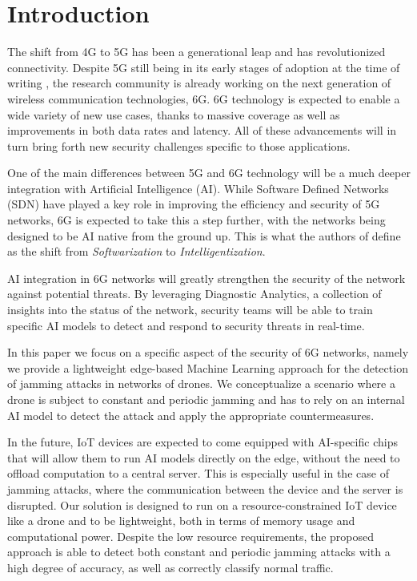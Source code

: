 \documentclass[futureinternet,article,submit,pdftex,moreauthors]{Definitions/mdpi}
\begin{document}
\section{Introduction}

The shift from 4G to 5G has been a generational leap and has revolutionized connectivity. 
Despite 5G still being in its early stages of adoption at the time of writing \cite{5GStatisticsTaylor}, the research community is already working on the next generation of wireless communication technologies, 6G. 
6G technology is expected to enable a wide variety of new use cases, thanks to massive coverage as well as improvements in both data rates and latency. All of these advancements will in turn bring forth new security challenges specific to those applications. 

One of the main differences between 5G and 6G technology will be a much deeper integration with Artificial Intelligence (AI). While Software Defined Networks (SDN) have played a key role in improving the efficiency and security 
of 5G networks, 6G is expected to take this a step further, with the networks being designed to be AI native from the ground up. This is what the authors of \cite{6GRoadmapLetaief} define as 
the shift from \textit{Softwarization} to \textit{Intelligentization}. 

AI integration in 6G networks will greatly strengthen the security of the network against potential threats. 
By leveraging Diagnostic Analytics, a collection of insights into the status of the network, security teams 
will be able to train specific AI models to detect and respond to security threats in real-time.

In this paper we focus on a specific aspect of the security of 6G networks, namely we provide a lightweight edge-based Machine Learning approach 
for the detection of jamming attacks in networks of drones. We conceptualize a scenario where a drone is subject to constant and periodic jamming and has to rely on an internal AI model to detect the attack and apply the appropriate countermeasures. 

In the future, IoT devices are expected to come equipped with AI-specific chips that will allow them to run AI models directly on the edge, without the need to offload computation to a central server. This is especially useful in the case of jamming attacks, where the communication between the device and the server is disrupted.
Our solution is designed to run on a resource-constrained IoT device like a drone and to be lightweight, both in terms of memory usage and computational power.
Despite the low resource requirements, the proposed approach is able to detect both constant and periodic jamming attacks with a high degree of accuracy, as well as correctly classify normal traffic. 
\end{document}
